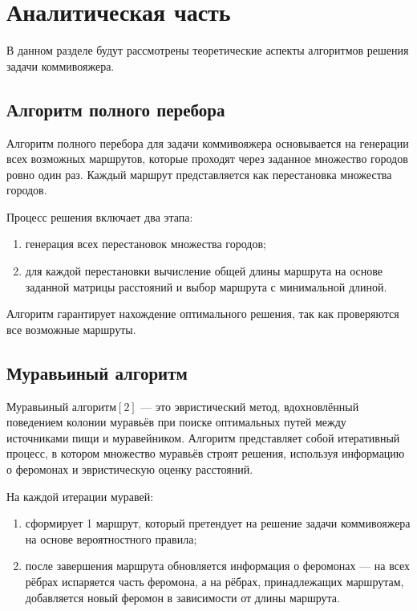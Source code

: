 \chapter{Аналитическая часть}\label{ch:-4}

В данном разделе будут рассмотрены теоретические аспекты алгоритмов решения задачи коммивояжера.

\section{Алгоритм полного перебора}

Алгоритм полного перебора для задачи коммивояжера основывается на генерации всех возможных маршрутов, которые проходят через заданное множество городов ровно один раз. Каждый маршрут представляется как перестановка множества городов.

Процесс решения включает два этапа:
\begin{enumerate}
    \item генерация всех перестановок множества городов;
    \item для каждой перестановки вычисление общей длины маршрута на основе заданной матрицы расстояний и выбор маршрута с минимальной длиной.
\end{enumerate}

Алгоритм гарантирует нахождение оптимального решения, так как проверяются все возможные маршруты.

\section{Муравьиный алгоритм}

Муравьиный алгоритм${[2]}$ — это эвристический метод, вдохновлённый поведением колонии муравьёв при поиске оптимальных путей между источниками пищи и муравейником. Алгоритм представляет собой итеративный процесс, в котором множество муравьёв строят решения, используя информацию о феромонах и эвристическую оценку расстояний.

На каждой итерации муравей:
\begin{enumerate}
    \item сформирует 1 маршрут, который претендует на решение задачи коммивояжера на основе вероятностного правила;
    \item после завершения маршрута обновляется информация о феромонах --- на всех рёбрах испаряется часть феромона, а на рёбрах, принадлежащих маршрутам, добавляется новый феромон в зависимости от длины маршрута.
\end{enumerate}

